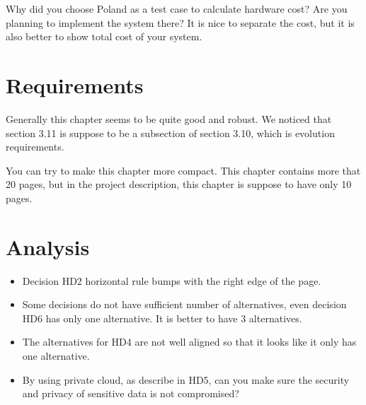 \documentclass[a4paper,10pt]{article}
\begin{document}
Why did you choose Poland as a test case to calculate hardware cost? Are you planning to implement the system there? It is nice to separate the cost, but it is also better to show total cost of your system.

\section{Requirements}
Generally this chapter seems to be quite good and robust. We noticed that section 3.11 is suppose to be a subsection of section 3.10, which is evolution requirements.

You can try to make this chapter more compact. This chapter contains more that 20 pages, but in the project description, this chapter is suppose to have only 10 pages.

\section{Analysis}
\begin{itemize}
\item Decision HD2 horizontal rule bumps with the right edge of the page.

\item Some decisions do not have sufficient number of alternatives, even decision HD6 has only one alternative. It is better to have 3 alternatives.

\item The alternatives for HD4 are not well aligned so that it looks like it only has one alternative.

\item By using private cloud, as describe in HD5, can you make sure the security and privacy of sensitive data is not compromised?
\end{itemize}
\end{document}
